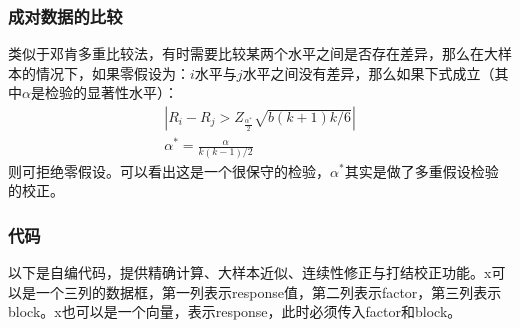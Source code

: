 \subsubsection{成对数据的比较}
类似于邓肯多重比较法，有时需要比较某两个水平之间是否存在差异，那么在大样本的情况下，如果零假设为：$i$水平与$j$水平之间没有差异，那么如果下式成立（其中$\alpha$是检验的显著性水平）：
\begin{gather*}
	\left|R_i-R_j>Z_{\frac{\alpha^*}{2}}\sqrt{b(k+1)k/6}\right| \\
	\alpha^*=\frac{\alpha}{k(k-1)/2}
\end{gather*}
则可拒绝零假设。可以看出这是一个很保守的检验，$\alpha^*$其实是做了多重假设检验的校正。
\subsubsection{代码}
以下是自编代码，提供精确计算、大样本近似、连续性修正与打结校正功能。x可以是一个三列的数据框，第一列表示response值，第二列表示factor，第三列表示block。x也可以是一个向量，表示response，此时必须传入factor和block。
\inputminted[bgcolor=white, linenos, frame=single, numbersep=5pt, breaklines]{r}{nonparametric-statistics/chapter3/friedman-test.R}